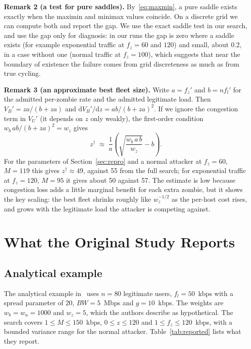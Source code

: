 \documentclass[conference]{IEEEtran}
\begin{document}
\textbf{Remark 2 (a test for pure saddles).} By~\eqref{eq:maxmin}, a pure saddle exists exactly when the maximin and minimax values coincide. On a discrete grid we can compute both and report the gap. We use the exact saddle test in our search, and use the gap only for diagnosis: in our runs the gap is zero where a saddle exists (for example exponential traffic at $f_z{=}60$ and $120$) and small, about 0.2, in a case without one (normal traffic at $f_z{=}100$), which suggests that near the boundary of existence the failure comes from grid discreteness as much as from true cycling.

\textbf{Remark 3 (an approximate best fleet size).} Write $a=f_z'$ and $b=n f_l'$ for the admitted per-zombie rate and the admitted legitimate load. Then $V_B'=za/(b+za)$ and $\mathrm{d}V_B'/\mathrm{d}z=ab/(b+za)^2$. If we ignore the congestion term in $V_U'$ (it depends on $z$ only weakly), the first-order condition $w_b\,ab/(b+za)^2=w_z$ gives
\begin{equation}
z^{\dagger}\;\approx\;\frac{1}{a}\left(\sqrt{\frac{w_b\,a\,b}{w_z}}-b\right).
\label{eq:zstar}
\end{equation}
For the parameters of Section~\ref{sec:repro} and a normal attacker at $f_z{=}60$, $M{=}119$ this gives $z^\dagger\approx49$, against 55 from the full search; for exponential traffic at $f_z{=}120$, $M{=}95$ it gives about 50 against 57. The estimate is low because congestion loss adds a little marginal benefit for each extra zombie, but it shows the key scaling: the best fleet shrinks roughly like $w_z^{-1/2}$ as the per-host cost rises, and grows with the legitimate load the attacker is competing against.

\section{What the Original Study Reports}\label{sec:reported}

\subsection{Analytical example}
The analytical example in~\cite{spyridopoulos2013} uses $n{=}80$ legitimate users, $f_l{=}50$~kbps with a spread parameter of 20, $BW{=}5$~Mbps and $g{=}10$~kbps. The weights are $w_b{=}w_u{=}1000$ and $w_z{=}5$, which the authors describe as hypothetical. The search covers $1\le M\le150$~kbps, $0\le z\le120$ and $1\le f_z\le120$~kbps, with a bounded variance range for the normal attacker. Table~\ref{tab:reported} lists what they report.
\end{document}
